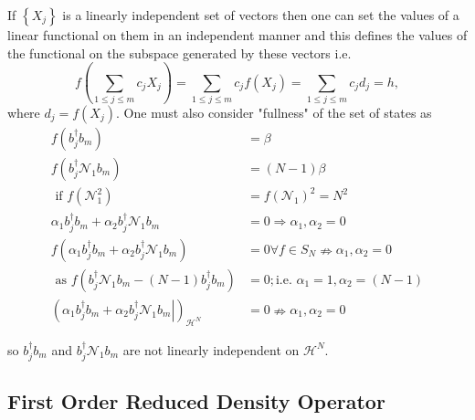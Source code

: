 \documentclass[aps,preprint]{revtex4}%
\begin{document}
If $\left\{  X_{j}\right\}  $ is a linearly independent set of vectors then
one can set the values of a linear functional on them in an independent manner
and this defines the values of the functional on the subspace generated by
these vectors i.e.
\begin{equation}
f\left(  \sum_{1\leq j\leq m}c_{j}X_{j}\right)  =\sum_{1\leq j\leq m}%
c_{j}f\left(  X_{j}\right)  =\sum_{1\leq j\leq m}c_{j}d_{j}=h,
\end{equation}
where $d_{j}=f\left(  X_{j}\right)  .$ One must also consider "fullness" of
the set of states as%
\begin{align}
f\left(  b_{j}^{\dagger}b_{m}\right)   &  =\beta\nonumber\\
f\left(  b_{j}^{\dagger}\mathcal{N}_{1}b_{m}\right)   &  =\left(  N-1\right)
\beta\nonumber\\
\text{ if }f\left(  \mathcal{N}_{1}^{2}\right)   &  =f\left(  \mathcal{N}%
_{1}\right)  ^{2}=N^{2}\nonumber\\
\alpha_{1}b_{j}^{\dagger}b_{m}+\alpha_{2}b_{j}^{\dagger}\mathcal{N}_{1}b_{m}
&  =0\Rightarrow\alpha_{1},\alpha_{2}=0\nonumber\\
f\left(  \alpha_{1}b_{j}^{\dagger}b_{m}+\alpha_{2}b_{j}^{\dagger}%
\mathcal{N}_{1}b_{m}\right)   &  =0\forall f\in S_{N}\nRightarrow\alpha
_{1},\alpha_{2}=0\nonumber\\
\text{ as }f\left(  b_{j}^{\dagger}\mathcal{N}_{1}b_{m}-\left(  N-1\right)
b_{j}^{\dagger}b_{m}\right)   &  =0;\text{i.e. }\alpha_{1}=1,\alpha
_{2}=\left(  N-1\right) \nonumber\\
\left(  \left.  \alpha_{1}b_{j}^{\dagger}b_{m}+\alpha_{2}b_{j}^{\dagger
}\mathcal{N}_{1}b_{m}\right\vert \right)  _{\mathcal{H}^{N}}  &
=0\nRightarrow\alpha_{1},\alpha_{2}=0
\end{align}


so $b_{j}^{\dagger}b_{m}$ and $b_{j}^{\dagger}\mathcal{N}_{1}b_{m}$ are not
linearly independent on $\mathcal{H}^{N}$.

\subsection{First Order Reduced Density Operator}
\end{document}
